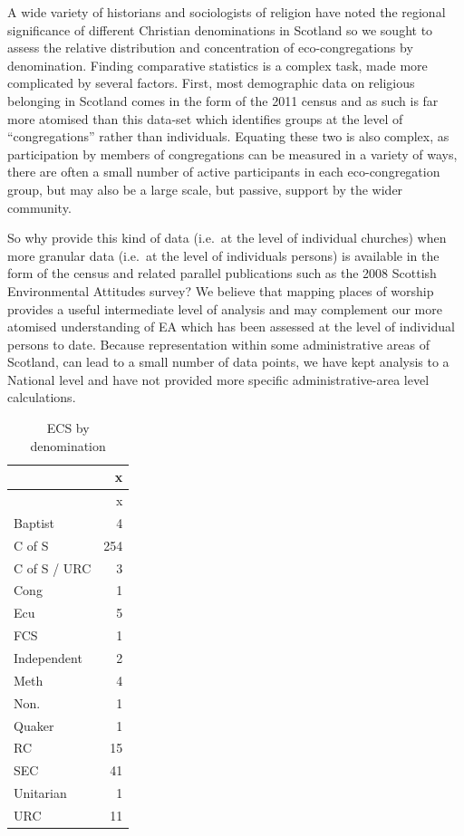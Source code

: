 \documentclass[11pt,]{article}
\begin{document}
A wide variety of historians and sociologists of religion have noted the
regional significance of different Christian denominations in Scotland
so we sought to assess the relative distribution and concentration of
eco-congregations by denomination. Finding comparative statistics is a
complex task, made more complicated by several factors. First, most
demographic data on religious belonging in Scotland comes in the form of
the 2011 census and as such is far more atomised than this data-set
which identifies groups at the level of ``congregations'' rather than
individuals. Equating these two is also complex, as participation by
members of congregations can be measured in a variety of ways, there are
often a small number of active participants in each eco-congregation
group, but may also be a large scale, but passive, support by the wider
community.

So why provide this kind of data (i.e.~at the level of individual
churches) when more granular data (i.e.~at the level of individuals
persons) is available in the form of the census and related parallel
publications such as the 2008 Scottish Environmental Attitudes survey?
We believe that mapping places of worship provides a useful intermediate
level of analysis and may complement our more atomised understanding of
EA which has been assessed at the level of individual persons to date.
Because representation within some administrative areas of Scotland, can
lead to a small number of data points, we have kept analysis to a
National level and have not provided more specific administrative-area
level calculations.

\begin{longtable}[]{@{}lr@{}}
\caption{ECS by denomination}\tabularnewline
\toprule
& x\tabularnewline
\midrule
\endfirsthead
\toprule
& x\tabularnewline
\midrule
\endhead
Baptist & 4\tabularnewline
C of S & 254\tabularnewline
C of S / URC & 3\tabularnewline
Cong & 1\tabularnewline
Ecu & 5\tabularnewline
FCS & 1\tabularnewline
Independent & 2\tabularnewline
Meth & 4\tabularnewline
Non. & 1\tabularnewline
Quaker & 1\tabularnewline
RC & 15\tabularnewline
SEC & 41\tabularnewline
Unitarian & 1\tabularnewline
URC & 11\tabularnewline
\bottomrule
\end{longtable}
\end{document}
